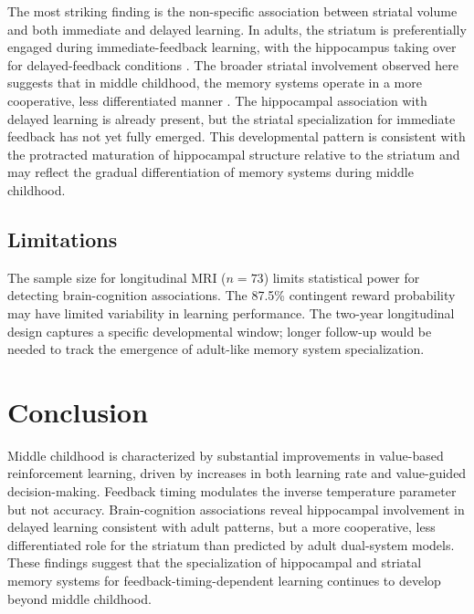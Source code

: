 \documentclass[12pt]{article}
\begin{document}
The most striking finding is the non-specific association between striatal volume and both immediate and delayed learning. In adults, the striatum is preferentially engaged during immediate-feedback learning, with the hippocampus taking over for delayed-feedback conditions \citep{foerde2006hippocampus, shohamy2008striatum}. The broader striatal involvement observed here suggests that in middle childhood, the memory systems operate in a more cooperative, less differentiated manner \citep{mccormick2019hippocampal}. The hippocampal association with delayed learning is already present, but the striatal specialization for immediate feedback has not yet fully emerged. This developmental pattern is consistent with the protracted maturation of hippocampal structure relative to the striatum and may reflect the gradual differentiation of memory systems during middle childhood.

\subsection{Limitations}

The sample size for longitudinal MRI ($n = 73$) limits statistical power for detecting brain-cognition associations. The 87.5\% contingent reward probability may have limited variability in learning performance. The two-year longitudinal design captures a specific developmental window; longer follow-up would be needed to track the emergence of adult-like memory system specialization.

\section{Conclusion}

Middle childhood is characterized by substantial improvements in value-based reinforcement learning, driven by increases in both learning rate and value-guided decision-making. Feedback timing modulates the inverse temperature parameter but not accuracy. Brain-cognition associations reveal hippocampal involvement in delayed learning consistent with adult patterns, but a more cooperative, less differentiated role for the striatum than predicted by adult dual-system models. These findings suggest that the specialization of hippocampal and striatal memory systems for feedback-timing-dependent learning continues to develop beyond middle childhood.



\end{document}
